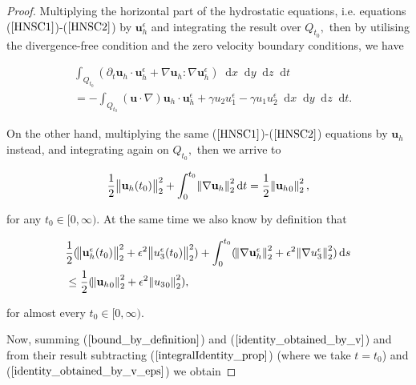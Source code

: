 \documentclass[11pt]{article}
\newcommand*\diff{\mathop{}\!\mathrm{d}}
\begin{document}
\begin{proof}

  Multiplying the horizontal part of the hydrostatic equations, i.e. equations ($\ref{HNSC1}$)-($\ref{HNSC2}$) by $\mathbf{u}_h^\epsilon$ and integrating the result over $Q_{t_0},$ then by utilising the divergence-free condition and the zero velocity boundary conditions, we have
  
  \begin{equation} \label{identity_obtained_by_v_eps}
    \begin{split}
      & \int_{Q_{t_0}} (\partial_t \mathbf{u}_h \cdot \mathbf{u}_h^\epsilon + \nabla \mathbf{u}_h : \nabla \mathbf{u}_h^\epsilon) \diff x \diff y \diff z \diff t \\
      & = - \int_{Q_{t_0}} (\mathbf{u} \cdot \nabla) \mathbf{u}_h \cdot \mathbf{u}_h^\epsilon + \gamma u_2 u_1^\epsilon - \gamma u_1 u_2^\epsilon \diff x \diff y \diff z \diff t.
    \end{split}
  \end{equation}
  
  On the other hand, multiplying the same ($\ref{HNSC1}$)-($\ref{HNSC2}$) equations by $\mathbf{u}_h$ instead, and integrating again on $Q_{t_0},$ then we arrive to
  
  \begin{equation} \label{identity_obtained_by_v}
    \frac{1}{2} \norm{\mathbf{u}_h(t_0)}_2^2 + \int_0^{t_0} \norm{\nabla \mathbf{u}_h}_2^2 \diff t = \frac{1}{2} \norm{{\mathbf{u}_h}_0}_2^2,
  \end{equation}
  
  for any $t_0 \in [0, \infty).$ At the same time we also know by definition that
  
  \begin{equation} \label{bound_by_definition}
    \begin{split}
      & \frac{1}{2}( \norm{\mathbf{u}_h^\epsilon (t_0)}_2^2 + \epsilon^2 \norm{u_3^\epsilon(t_0)}_2^2)+ \int_0^{t_0} (\norm{\nabla \mathbf{u}_h^\epsilon}_2^2 + \epsilon^2 \norm{\nabla u_3^\epsilon}_2^2) \diff s \\
      & \leq \frac{1}{2} (\norm{{\mathbf{u}_h}_0}_2^2 + \epsilon^2 \norm{{u_3}_0}_2^2),
    \end{split}
  \end{equation}
  
  for almost every $t_0 \in [0, \infty).$
  
  Now, summing ($\ref{bound_by_definition}$) and ($\ref{identity_obtained_by_v}$) and from their result subtracting ($\ref{integralIdentity_prop}$) (where we take $t= t_0$) and ($\ref{identity_obtained_by_v_eps}$) we obtain
  

\end{proof}
\end{document}
